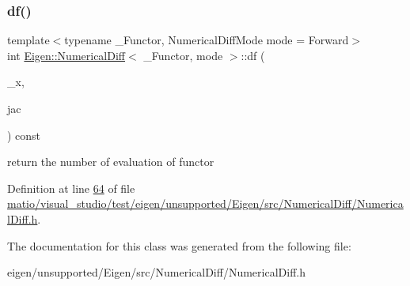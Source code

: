 \subsubsection{\texorpdfstring{df()}{df()}\hspace{0.1cm}{\footnotesize\ttfamily [2/2]}}
{\footnotesize\ttfamily template$<$typename \+\_\+\+Functor, Numerical\+Diff\+Mode mode = Forward$>$ \\
int \hyperlink{class_eigen_1_1_numerical_diff}{Eigen\+::\+Numerical\+Diff}$<$ \+\_\+\+Functor, mode $>$\+::df (\begin{DoxyParamCaption}\item[{const Input\+Type \&}]{\+\_\+x,  }\item[{Jacobian\+Type \&}]{jac }\end{DoxyParamCaption}) const\hspace{0.3cm}{\ttfamily [inline]}}

return the number of evaluation of functor 

Definition at line \hyperlink{matio_2visual__studio_2test_2eigen_2unsupported_2_eigen_2src_2_numerical_diff_2_numerical_diff_8h_source_l00064}{64} of file \hyperlink{matio_2visual__studio_2test_2eigen_2unsupported_2_eigen_2src_2_numerical_diff_2_numerical_diff_8h_source}{matio/visual\+\_\+studio/test/eigen/unsupported/\+Eigen/src/\+Numerical\+Diff/\+Numerical\+Diff.\+h}.



The documentation for this class was generated from the following file\+:\begin{DoxyCompactItemize}
\item 
eigen/unsupported/\+Eigen/src/\+Numerical\+Diff/\+Numerical\+Diff.\+h\end{DoxyCompactItemize}
